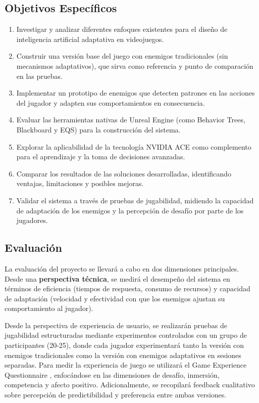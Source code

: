 \documentclass[informe]{upropuesta}
\begin{document}
\subsection*{Objetivos Específicos}
\begin{enumerate}
    \item Investigar y analizar diferentes enfoques existentes para el diseño de inteligencia artificial adaptativa en videojuegos.
    \item Construir una versión base del juego con enemigos tradicionales (sin mecanismos adaptativos), que sirva como referencia y punto de comparación en las pruebas.
    \item Implementar un prototipo de enemigos que detecten patrones en las acciones del jugador y adapten sus comportamientos en consecuencia.
    \item Evaluar las herramientas nativas de Unreal Engine (como Behavior Trees, Blackboard y EQS) para la construcción del sistema.
    \item Explorar la aplicabilidad de la tecnología NVIDIA ACE como complemento para el aprendizaje y la toma de decisiones avanzadas.
    \item Comparar los resultados de las soluciones desarrolladas, identificando ventajas, limitaciones y posibles mejoras.
    \item Validar el sistema a través de pruebas de jugabilidad, midiendo la capacidad de adaptación de los enemigos y la percepción de desafío por parte de los jugadores.
\end{enumerate}

\subsection*{Evaluación}
La evaluación del proyecto se llevará a cabo en dos dimensiones principales. Desde una \textbf{perspectiva técnica}, se medirá el desempeño del sistema en términos de eficiencia (tiempos de respuesta, consumo de recursos) y capacidad de adaptación (velocidad y efectividad con que los enemigos ajustan su comportamiento al jugador). 

Desde la perspectiva de experiencia de usuario, se realizarán pruebas de jugabilidad estructuradas mediante experimentos controlados con un grupo de participantes (20-25), donde cada jugador experimentará tanto la versión con enemigos tradicionales como la versión con enemigos adaptativos en sesiones separadas. Para medir la experiencia de juego se utilizará el Game Experience Questionnaire \cite{GEQuestionare} , enfocándose en las dimensiones de desafío, inmersión, competencia y afecto positivo. Adicionalmente, se recopilará feedback cualitativo sobre percepción de predictibilidad y preferencia entre ambas versiones.
\end{document}
